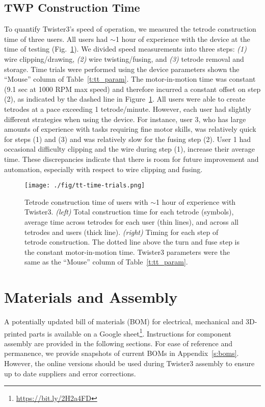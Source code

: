 \documentclass[11pt,a4paper]{article}
\begin{document}
\subsection{TWP Construction Time}
To quantify Twister3's speed of operation, we measured the tetrode construction
time of three users. All users had $\sim$1 hour of experience with the device
at the time of testing (Fig.~\ref{f:tt_time}). We divided speed measurements
into three steps: \textit{(1)} wire clipping/drawing, \textit{(2)} wire
twisting/fusing, and \textit{(3)} tetrode removal and storage.  Time trials
were performed using the device parameters shown the ``Mouse'' column of
Table~\ref{t:tt_param}. The motor-in-motion time was constant (9.1 sec at
1000 RPM max speed) and therefore incurred a constant offset on step (2), as
indicated by the dashed line in Figure~\ref{f:tt_time}. All users were able to
create tetrodes at a pace exceeding 1 tetrode/minute. However, each user had
slightly different strategies when using the device. For instance, user 3, who
has large amounts of experience with tasks requiring fine motor skills, was
relatively quick for steps (1) and (3) and was relatively slow for the fusing
step (2).  User 1 had occasional difficulty clipping and the wire during step
(1), increase their average time. These discrepancies indicate that there is
room for future improvement and automation, especially with respect to wire
clipping and fusing.

\begin{figure}
\centering
\texttt{[image: ./fig/tt-time-trials.png]}
\caption{
    Tetrode construction time of users with $\sim$1 hour of experience with
    Twister3. \textit{(left)} Total construction time for each tetrode
    (symbols), average time across tetrodes for each user (thin lines), and across all tetrodes and users (thick
    line). \textit{(right)} Timing for each step of tetrode construction.
    The dotted line above the turn and fuse step is the constant motor-in-motion
    time. Twister3 parameters were the same as the ``Mouse'' column of
    Table~\ref{t:tt_param}.
}
\label{f:tt_time}
\end{figure}

\section{Materials and Assembly}
A potentially updated bill of materials (BOM) for electrical, mechanical and
3D-printed parts is available on a Google
sheet\footnote{\url{https://bit.ly/2H2a4FD}}. Instructions for component assembly are
provided in the following sections. For ease of reference and permanence, we
provide snapshots of current BOMs in Appendix~\ref{s:boms}. However, the online
versions should be used during Twister3 assembly to ensure up to date suppliers
and error corrections.
\end{document}
